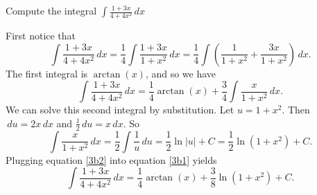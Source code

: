 \documentclass[handout, nooutcomes]{ximera}
\renewenvironment{freeResponse}{
\ifhandout\setbox0\vbox\bgroup\else
\begin{trivlist}\item[\hskip \labelsep\bfseries Solution:\hspace{2ex}]
\fi}
{\ifhandout\egroup\else
\end{trivlist}
\fi}
\renewcommand{\d}{\,d}
\begin{document}
\begin{problem}
Compute the integral $ \int \frac{1+3x}{4+4x^2} \d x$
  \begin{freeResponse}
		First notice that
		\begin{equation*}
			\int \frac{1+3x}{4+4x^2} \d x = \frac{1}{4} \int \frac{1+3x}{1+x^2} \d x = \frac{1}{4} \int \left( \frac{1}{1+x^2} + \frac{3x}{1+x^2} \right) \d x.
		\end{equation*}
		The first integral is $\arctan(x)$, and so we have
		\begin{equation}\label{3b1}
			\int \frac{1+3x}{4+4x^2} \d x = \frac{1}{4} \arctan(x) + \frac{3}{4} \int \frac{x}{1+x^2} \d x.
		\end{equation}
		We can solve this second integral by substitution.
    Let $u=1+x^2$.
    Then $\d u = 2x \d x$ and $\frac{1}{2} \d u = x \d x$.
    So
		\begin{equation}\label{3b2}
			\int \frac{x}{1+x^2} \d x = \frac{1}{2} \int \frac{1}{u} \d u = \frac{1}{2} \ln|u| +C = \frac{1}{2} \ln(1+x^2) + C.
		\end{equation}
		Plugging equation \eqref{3b2} into equation \eqref{3b1} yields
		\begin{equation*}
			\int \frac{1+3x}{4+4x^2} \d x = \frac{1}{4} \arctan(x) + \frac{3}{8} \ln(1+x^2) + C.
		\end{equation*}
	\end{freeResponse}
\end{problem}
\end{document}
